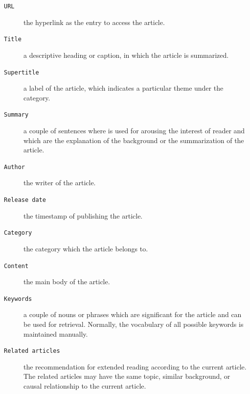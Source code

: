 \begin{description}
    \item[\texttt{URL}] the hyperlink as the entry to access the article.

    \item[\texttt{Title}] a descriptive heading or caption, in which the article is summarized.
    \item[\texttt{Supertitle}] a label of the article, which indicates a particular theme under the category.
    \item[\texttt{Summary}] a couple of sentences where is used for arousing the interest of reader and which are the explanation of the background or the summarization of the article. 
    \item[\texttt{Author}] the writer of the article.
    \item[\texttt{Release date}] the timestamp of publishing the article.
    \item[\texttt{Category}] the category which the article belongs to.

    \item[\texttt{Content}] the main body of the article.
    
    \item[\texttt{Keywords}] a couple of nouns or phrases which are significant for the article and can be used for retrieval. Normally, the vocabulary of all possible keywords is maintained manually. 

    \item[\texttt{Related articles}] the recommendation for extended reading according to the current article. The related articles may have the same topic, similar background, or causal relationship to the current article.
        
\end{description}

